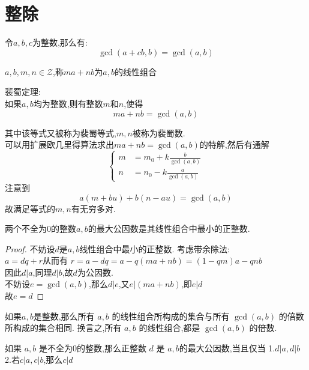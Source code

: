 \section{整除}

\begin{proposition}
  令$a,b,c$为整数,那么有:
  $$
  \gcd(a+cb,b)=\gcd(a,b)
  $$
\end{proposition}

\begin{definition}
  $a,b,m,n\in \mathcal{Z}$,称$ma+nb$为$a,b$的线性组合
\end{definition}


\begin{theorem}
  裴蜀定理:\\
  如果$a,b$均为整数,则有整数$m$和$n$,使得
  $$
  ma+nb=\gcd(a,b)
  $$
\end{theorem}
其中该等式又被称为裴蜀等式,$m,n$被称为裴蜀数.\\
可以用扩展欧几里得算法求出$ma+nb=\gcd(a,b)$的特解,然后有通解
$$
\begin{cases}
  m&=m_0+k\frac{b}{\gcd(a,b)}\\
  n&=n_0-k\frac{a}{\gcd(a,b)}
\end{cases}
$$
注意到
$$
a(m+bu)+b(n-au)=\gcd(a,b)
$$
故满足等式的$m,n$有无穷多对.
\begin{lemma}
  两个不全为0的整数$a,b$的最大公因数是其线性组合中最小的正整数.
\end{lemma}

\begin{proof}
  不妨设$d$是$a,b$线性组合中最小的正整数.
  考虑带余除法:\\
  $a=dq+r$从而有
  $r=a-dq=a-q(ma+nb)=(1-qm)a-qnb$\\
  因此$d|a$,同理$d|b$,故$d$为公因数.\\
  不妨设$e=\gcd(a,b)$,那么$d|e$,又$e|(ma+nb)$,即$e|d$\\
  故$e=d$
\end{proof}

\begin{theorem}
  如果$a,b$是整数,那么所有 $a,b$ 的线性组合所构成的集合与所有
  $\gcd(a,b)$  的倍数所构成的集合相同.
  换言之,所有 $a,b$ 的线性组合,都是 $\gcd(a,b)$ 的倍数.
\end{theorem}

\begin{theorem}
  如果 $a,b$ 是不全为0的整数,那么正整数 $d$ 是 $a,b$的最大公因数,当且仅当
  1.$d|a,d|b$
  2.若$c|a,c|b$,那么$c|d$
\end{theorem}

